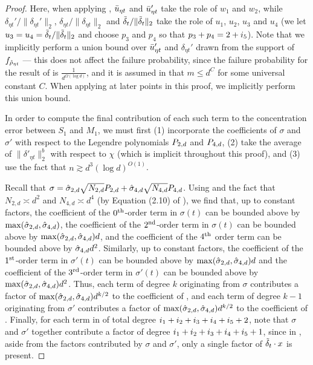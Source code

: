 \begin{proof}
Here, when applying , $\bar{u}_{\eta t}$ and $\bar{u}_{\eta t}'$ take the role of $w_1$ and $w_2$, while $\delta_{\eta t}'/\|\delta_{\eta t}'\|_2$, $\delta_{\eta t}/\|\delta_{\eta t}\|_2$ and ${\tilde{\delta}}_t/\|{\tilde{\delta}}_t\|_2$ take the role of $u_1$, $u_2$, $u_3$ and $u_4$ (we let $u_3 = u_4 = {\tilde{\delta}}_t/\|{\tilde{\delta}}_t\|_2$ and choose $p_3$ and $p_4$ so that $p_3 + p_4 = 2 + i_{5}$). Note that we implicitly perform a union bound over $\bar{u}_{\eta t}'$ and $\delta_{\eta t}'$ drawn from the support of $f_{{\hat{\rho}}_{\eta t}}$ --- this does not affect the failure probability, since the failure probability for the result of  is $\frac{1}{d^{\Omega(\log d)}}$, and it is assumed in  that $m \leq d^C$ for some universal constant $C$. When applying  at later points in this proof, we implicitly perform this union bound.

In order to compute the final contribution of each such term to the concentration error between $S_1$ and $M_1$, we must first (1) incorporate the coefficients of $\sigma$ and $\sigma'$ with respect to the Legendre polynomials ${P_{2, d}}$ and ${P_{4, d}}$, (2) take the average of $\|\delta'_{\eta t}\|_2^b$ with respect to $\chi$ (which is implicit throughout this proof), and (3) use the fact that $n \gtrsim d^3 (\log d)^{O(1)}$.

Recall that $\sigma = \hat{\sigma}_{2, d} \sqrt{N_{2, d}} {P_{2, d}} + \hat{\sigma}_{4, d} \sqrt{N_{4, d}} {P_{4, d}}$. Using  and the fact that $N_{2, d} \asymp d^2$ and $N_{4, d} \asymp d^4$ (by Equation (2.10) of \citet{atkinson2012spherical}), we find that, up to constant factors, the coefficient of the $0^{\textup{th}}$-order term in $\sigma(t)$ can be bounded above by $\max(\hat{\sigma}_{2, d}, \hat{\sigma}_{4, d})$, the coefficient of the $2^{\textup{nd}}$-order term in $\sigma(t)$ can be bounded above by $\max(\hat{\sigma}_{2, d}, \hat{\sigma}_{4, d}) d$, and the coefficient of the $4^{\textup{th}}$ order term can be bounded above by $\hat{\sigma}_{4, d} d^2$. Similarly, up to constant factors, the coefficient of the $1^{\textup{st}}$-order term in $\sigma'(t)$ can be bounded above by $\max(\hat{\sigma}_{2, d}, \hat{\sigma}_{4, d}) d$ and the coefficient of the $3^{\textup{rd}}$-order term in $\sigma'(t)$ can be bounded above by $\max(\hat{\sigma}_{2, d}, \hat{\sigma}_{4, d}) d^2$. Thus, each term of degree $k$ originating from $\sigma$ contributes a factor of $\max(\hat{\sigma}_{2, d}, \hat{\sigma}_{4, d}) d^{k/2}$ to the coefficient of , and each term of degree $k - 1$ originating from $\sigma'$ contributes a factor of $\max(\hat{\sigma}_{2, d}, \hat{\sigma}_{4, d}) d^{k/2}$ to the coefficient of . Finally, for each term in  of total degree $i_{1} + i_{2} + i_{3} + i_{4} + i_{5} + 2$, note that $\sigma$ and $\sigma'$ together contribute a factor of degree $i_{1} + i_{2} + i_{3} + i_{4} + i_{5} + 1$, since in , aside from the factors contributed by $\sigma$ and $\sigma'$, only a single factor of ${\tilde{\delta}}_t \cdot x$ is present.


\end{proof}
